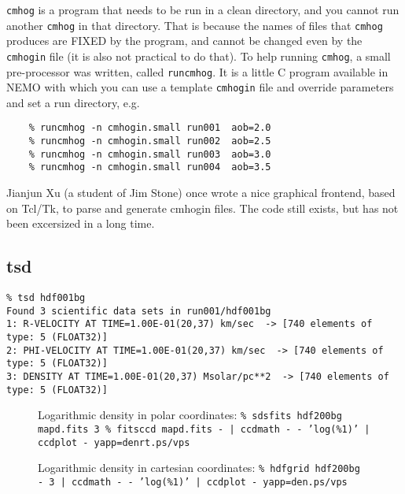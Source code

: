 \documentclass[11pt]{article}
\begin{document}
{\tt cmhog} is a program that needs to be run in a clean directory, and you
cannot run another {\tt cmhog} in that directory. That is because the names
of files that {\tt cmhog} produces are FIXED by the program, and cannot be
changed even by the {\tt cmhogin} file (it is also not practical to do that).
To help running {\tt cmhog}, a small pre-processor was written, called
{\tt runcmhog}. It is a little C program available in NEMO with which you
can use a template {\tt cmhogin} file and override parameters and set
a run directory, e.g.

\begin{verbatim}
    % runcmhog -n cmhogin.small run001  aob=2.0
    % runcmhog -n cmhogin.small run002  aob=2.5
    % runcmhog -n cmhogin.small run003  aob=3.0
    % runcmhog -n cmhogin.small run004  aob=3.5
\end{verbatim}

Jianjun Xu (a student of Jim Stone) once wrote a nice graphical frontend,
based on Tcl/Tk, to parse and generate cmhogin files. The code still
exists, but has not been excersized in a long time.

\subsection{tsd}

\footnotesize\begin{verbatim}
% tsd hdf001bg 
Found 3 scientific data sets in run001/hdf001bg
1: R-VELOCITY AT TIME=1.00E-01(20,37) km/sec  -> [740 elements of type: 5 (FLOAT32)]
2: PHI-VELOCITY AT TIME=1.00E-01(20,37) km/sec  -> [740 elements of type: 5 (FLOAT32)]
3: DENSITY AT TIME=1.00E-01(20,37) Msolar/pc**2  -> [740 elements of type: 5 (FLOAT32)]
\end{verbatim}\normalsize

\begin{figure}[htbp]
\epsfysize=5cm
\caption{
Logarithmic density in polar coordinates:\newline
  \tt \% sdsfits hdf200bg mapd.fits 3\newline
  \tt \% fitsccd mapd.fits - | ccdmath - - 'log(\%1)' | ccdplot - yapp=denrt.ps/vps
}

\end{figure}

\begin{figure}[htbp]
\epsfysize=5cm
\caption{
Logarithmic density in cartesian coordinates:\newline
  \tt \% hdfgrid hdf200bg - 3 | ccdmath - - 'log(\%1)' | ccdplot - yapp=den.ps/vps
}
\end{figure}
\end{document}
